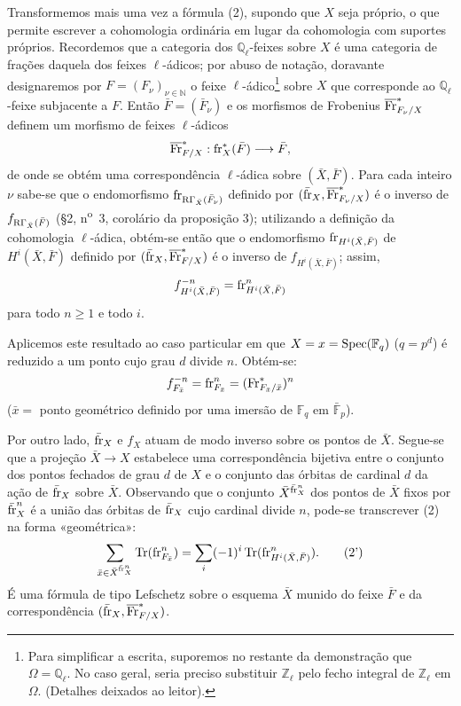 Transformemos mais uma vez a fórmula (2), supondo que $X$ seja próprio, o que permite escrever a cohomologia ordinária em lugar da cohomologia com suportes próprios. Recordemos que a categoria dos $\mathbb Q_\ell$-feixes sobre $X$ é uma categoria de frações daquela dos feixes $\ell$-ádicos; por abuso de notação, doravante designaremos por $F=(F_\nu)_{\nu\in\mathbb N}$ o feixe $\ell$-ádico\footnote{Para simplificar a escrita, suporemos no restante da demonstração que $\Omega=\mathbb Q_\ell$. No caso geral, seria preciso substituir $\mathbb Z_\ell$ pelo fecho integral de $\mathbb Z_\ell$ em $\Omega$. (Detalhes deixados ao leitor).} sobre $X$ que corresponde ao $\mathbb Q_\ell$-feixe subjacente a $F$. Então $\bar F=(\bar F_\nu)$ e os morfismos de Frobenius $\overline{\operatorname{Fr}}^*_{F_\nu/X}$ definem um morfismo de feixes $\ell$-ádicos
\[
\overline{\operatorname{Fr}}^*_{F/X}:\operatorname{fr}_X^*(\bar F)\longrightarrow\bar F,
\]
de onde se obtém uma correspondência $\ell$-ádica sobre $(\bar X,\bar F)$. Para cada inteiro $\nu$ sabe-se que o endomorfismo $\operatorname{fr}_{\mathrm{R}\Gamma_{\bar X}(\bar F_\nu)}$ definido por $(\bar{\operatorname{fr}}_X,\overline{\operatorname{Fr}}^*_{F_\nu/X})$ é o inverso de $f_{\mathrm{R}\Gamma_{\bar X}(\bar F)}$ (§2, n\textsuperscript{o}~3, corolário da proposição 3); utilizando a definição da cohomologia $\ell$-ádica, obtém-se então que o endomorfismo $\operatorname{fr}_{H^i(\bar X,\bar F)}$ de $H^i(\bar X,\bar F)$ definido por $(\bar{\operatorname{fr}}_X,\overline{\operatorname{Fr}}^*_{F/X})$ é o inverso de $f_{H^i(\bar X,\bar F)}$; assim,
\[
f^{-n}_{H^i(\bar X,\bar F)}=\operatorname{fr}^n_{H^i(\bar X,\bar F)}
\]
para todo $n\ge1$ e todo $i$.

Aplicemos este resultado ao caso particular em que $X=x=\operatorname{Spec}(\mathbb F_q)$ ($q=p^d$) é reduzido a um ponto cujo grau $d$ divide $n$. Obtém-se:
\[
f^{-n}_{F_{\bar x}}=\operatorname{fr}^n_{F_{\bar x}}=(\operatorname{Fr}^*_{F_{\bar x}/\bar x})^n
\]
($\bar x=$ ponto geométrico definido por uma imersão de $\mathbb F_q$ em $\bar{\mathbb F}_p$).

Por outro lado, $\bar{\operatorname{fr}}_X$ e $f_X$ atuam de modo inverso sobre os pontos de $\bar X$. Segue-se que a projeção $\bar X\to X$ estabelece uma correspondência bijetiva entre o conjunto dos pontos fechados de grau $d$ de $X$ e o conjunto das órbitas de cardinal $d$ da ação de $\bar{\operatorname{fr}}_X$ sobre $\bar X$. Observando que o conjunto $\bar X^{\bar{\operatorname{fr}}_X^n}$ dos pontos de $\bar X$ fixos por $\bar{\operatorname{fr}}_X^n$ é a união das órbitas de $\bar{\operatorname{fr}}_X$ cujo cardinal divide $n$, pode-se transcrever (2) na forma «geométrica»:
\[
\sum_{\bar x\in\bar X^{\bar{\operatorname{fr}}_X^n}}\operatorname{Tr}(\operatorname{fr}^n_{F_{\bar x}})
=\sum_i(-1)^i\operatorname{Tr}(\operatorname{fr}^n_{H^i(\bar X,\bar F)}).
\tag{2'}
\]
É uma fórmula de tipo Lefschetz sobre o esquema $\bar X$ munido do feixe $\bar F$ e da correspondência $(\bar{\operatorname{fr}}_X,\overline{\operatorname{Fr}}^*_{F/X})$.
